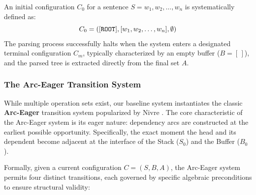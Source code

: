 \documentclass[12pt,a4paper]{article}
\begin{document}
An initial configuration $C_0$ for a sentence $S = w_1, w_2, \dots, w_n$ is systematically defined as:
\begin{equation}
    C_0 = ([\text{\texttt{ROOT}}], [w_1, w_2, \dots, w_n], \emptyset)
\end{equation}
The parsing process successfully halts when the system enters a designated terminal configuration $C_m$, typically characterized by an empty buffer ($B = [\,]$), and the parsed tree is extracted directly from the final set $A$.

\subsubsection{The Arc-Eager Transition System}

While multiple operation sets exist, our baseline system instantiates the classic \textbf{Arc-Eager} transition system popularized by Nivre \cite{nivre2003efficient}. The core characteristic of the Arc-Eager system is its eager nature: dependency arcs are constructed at the earliest possible opportunity. Specifically, the exact moment the head and its dependent become adjacent at the interface of the Stack ($S_0$) and the Buffer ($B_0$).

Formally, given a current configuration $C = (S, B, A)$, the Arc-Eager system permits four distinct transitions, each governed by specific algebraic preconditions to ensure structural validity:
\end{document}
